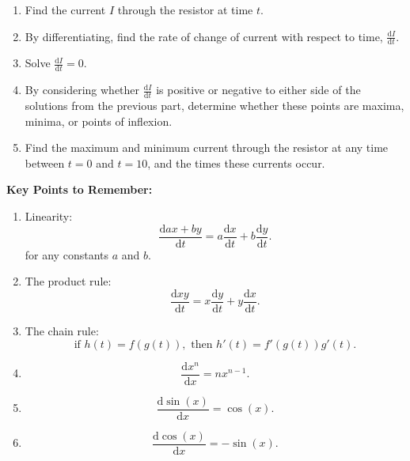 \documentclass{article}
\newcommand{\deriv}[2]{\frac{\mathrm{d}#1}{\mathrm{d}#2}}
\begin{document}
\begin{enumerate}
	\item Find the current $I$ through the resistor at time $t$.
	\item By differentiating, find the rate of change of current with respect to time, $\deriv{I}{t}$.
	\item Solve $\deriv{I}{t}=0$.
	\item By considering whether $\deriv{I}{t}$ is positive or negative to either side of the solutions from the previous part, determine whether these points are maxima, minima, or points of inflexion.
	\item Find the maximum and minimum current through the resistor at any time between $t=0$ and $t=10$, and the times these currents occur.
\end{enumerate}


\clearpage


{\bf Key Points to Remember:}

\vspace{5mm}

\begin{enumerate}
	\item Linearity:
		\[\deriv{ax+by}{t}=a\deriv{x}{t}+b\deriv{y}{t}.\]
		for any constants $a$ and $b$.
	\item The product rule:
		\[\deriv{xy}{t}=x\deriv{y}{t}+y\deriv{x}{t}.\]
	\item The chain rule:
		\[\mbox{if } h(t)=f(g(t)),\mbox{ then } h'(t)=f'(g(t))g'(t).\]
	\item \[\deriv{x^n}{x}=nx^{n-1}.\]
	\item \[\deriv{\sin(x)}{x}=\cos(x).\]
	\item \[\deriv{\cos(x)}{x}=-\sin(x).\]
\end{enumerate}
\end{document}

